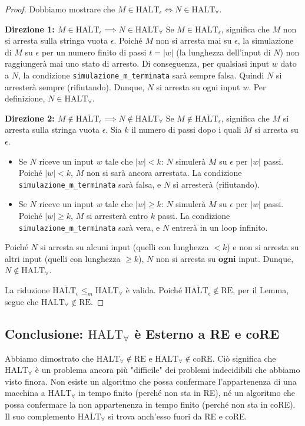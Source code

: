 \documentclass[a4paper]{article}
\theoremstyle{definition} %
\begin{document}
\begin{proof}
Dobbiamo mostrare che $M \in \overline{\text{HALT}_\epsilon} \iff N \in \text{HALT}_\forall$.

\textbf{Direzione 1: $M \in \overline{\text{HALT}_\epsilon} \implies N \in \text{HALT}_\forall$}
Se $M \in \overline{\text{HALT}_\epsilon}$, significa che $M$ non si arresta sulla stringa vuota $\epsilon$.
Poiché $M$ non si arresta mai su $\epsilon$, la simulazione di $M$ su $\epsilon$ per un numero finito di passi $t = |w|$ (la lunghezza dell'input di $N$) non raggiungerà mai uno stato di arresto.
Di conseguenza, per qualsiasi input $w$ dato a $N$, la condizione \texttt{simulazione\_m\_terminata} sarà sempre falsa. Quindi $N$ si arresterà sempre (rifiutando).
Dunque, $N$ si arresta su ogni input $w$. Per definizione, $N \in \text{HALT}_\forall$.

\textbf{Direzione 2: $M \notin \overline{\text{HALT}_\epsilon} \implies N \notin \text{HALT}_\forall$}
Se $M \notin \overline{\text{HALT}_\epsilon}$, significa che $M$ si arresta sulla stringa vuota $\epsilon$.
Sia $k$ il numero di passi dopo i quali $M$ si arresta su $\epsilon$.
\begin{itemize}
    \item Se $N$ riceve un input $w$ tale che $|w| < k$:
    $N$ simulerà $M$ su $\epsilon$ per $|w|$ passi. Poiché $|w| < k$, $M$ non si sarà ancora arrestata. La condizione \texttt{simulazione\_m\_terminata} sarà falsa, e $N$ si arresterà (rifiutando).
    \item Se $N$ riceve un input $w$ tale che $|w| \ge k$:
    $N$ simulerà $M$ su $\epsilon$ per $|w|$ passi. Poiché $|w| \ge k$, $M$ si arresterà entro $k$ passi. La condizione \texttt{simulazione\_m\_terminata} sarà vera, e $N$ entrerà in un loop infinito.
\end{itemize}
Poiché $N$ si arresta su alcuni input (quelli con lunghezza $< k$) e non si arresta su altri input (quelli con lunghezza $\ge k$), $N$ non si arresta su \textbf{ogni} input.
Dunque, $N \notin \text{HALT}_\forall$.

La riduzione $\overline{\text{HALT}_\epsilon} \le_m \text{HALT}_\forall$ è valida.
Poiché $\overline{\text{HALT}_\epsilon} \notin \text{RE}$, per il Lemma, segue che $\text{HALT}_\forall \notin \text{RE}$.
\end{proof}

\subsection{Conclusione: $\text{HALT}_\forall$ è Esterno a RE e coRE}
Abbiamo dimostrato che $\text{HALT}_\forall \notin \text{RE}$ e $\text{HALT}_\forall \notin \text{coRE}$.
Ciò significa che $\text{HALT}_\forall$ è un problema ancora più "difficile" dei problemi indecidibili che abbiamo visto finora. Non esiste un algoritmo che possa confermare l'appartenenza di una macchina a $\text{HALT}_\forall$ in tempo finito (perché non sta in RE), né un algoritmo che possa confermare la non appartenenza in tempo finito (perché non sta in coRE).
Il suo complemento $\overline{\text{HALT}_\forall}$ si trova anch'esso fuori da RE e coRE.
\end{document}
